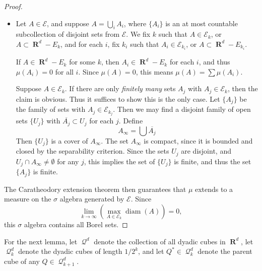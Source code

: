 \documentclass{article}
\DeclareMathOperator{\RR}{\mathbf{R}}
\DeclareMathOperator{\DQ}{\mathcal{Q}}
\DeclareMathOperator{\diam}{\text{diam}}
\theoremstyle{plain}
\begin{document}
\begin{proof}
\begin{itemize}
        \item Let $A \in \mathcal{E}$, and suppose $A = \bigcup_i A_i$, where $\{ A_i \}$ is an at most countable subcollection of disjoint sets from $\mathcal{E}$. We fix $k$ such that $A \in \mathcal{E}_k$, or $A \subset \RR^d - E_k$, and for each $i$, fix $k_i$ such that $A_i \in \mathcal{E}_{k_i}$, or $A \subset \RR^d - E_{k_i}$.

        If $A \in \RR^d - E_k$ for some $k$, then $A_i \in \RR^d - E_k$ for each $i$, and thus $\mu(A_i) = 0$ for all $i$. Since $\mu(A) = 0$, this means $\mu(A) = \sum \mu(A_i)$.

        Suppose $A \in \mathcal{E}_k$. If there are only \emph{finitely many} sets $A_j$ with $A_j \in \mathcal{E}_k$, then the claim is obvious. Thus it suffices to show this is the only case. Let $\{ A_j \}$ be the family of sets with $A_j \in \mathcal{E}_{k_j}$. Then we may find a disjoint family of open sets $\{ U_j \}$ with $\overline{A_j} \subset U_j$ for each $j$. Define
        \[ A_\infty = \bigcup \overline{A_j} \]
        Then $\{ U_j \}$ is a cover of $A_\infty$. The set $A_\infty$ is compact, since it is bounded and closed by the separability criterion. Since the sets $U_j$ are disjoint, and $U_j \cap A_\infty \neq \emptyset$ for any $j$, this implies the set of $\{ U_j \}$ is finite, and thus the set $\{ A_j \}$ is finite.
    \end{itemize}
    The Caratheodory extension theorem then guarantees that $\mu$ extends to a measure on the $\sigma$ algebra generated by $\mathcal{E}$. Since
    \[ \lim_{k \to \infty} \left( \max_{A \in \mathcal{E}_k} \diam(A) \right) = 0, \]
    this $\sigma$ algebra contains all Borel sets.
\end{proof}

For the next lemma, let $\DQ^d$ denote the collection of all dyadic cubes in $\RR^d$, let $\DQ^d_k$ denote the dyadic cubes of length $1/2^k$, and let $Q^* \in \DQ^d_k$ denote the parent cube of any $Q \in \DQ^d_{k+1}$.
\end{document}
